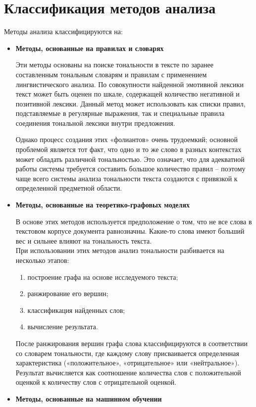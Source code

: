 \documentclass[a4paper,12pt]{report}
\begin{document}
\section{Классификация методов анализа}
\hspace{0.6cm}Методы анализа классифицируются на:
\begin{itemize}

\item \textbf{Методы, основанные на правилах и словарях}

\hspace{0.6cm}Эти методы основаны на поиске тональности в тексте по заранее составленным тональным словарям и правилам с применением лингвистического анализа. По совокупности найденной эмотивной лексики текст может быть оценен по шкале, содержащей количество негативной и позитивной лексики. Данный метод может использовать как списки правил, подставляемые в регулярные выражения, так и специальные правила соединения тональной лексики внутри предложения.

\hspace{0.6cm}Однако процесс создания этих «фолиантов» очень трудоемкий; основной проблемой является тот факт, что одно и то же слово в разных контекстах может обладать различной тональностью. Это означает, что для адекватной работы системы требуется составить большое количество правил – поэтому чаще всего системы анализа тональности текста создаются с привязкой к определенной предметной области.\\

\item \textbf{Методы, основанные на теоретико-графовых моделях}

\hspace{0.6cm}В основе этих методов используется предположение о том, что не все слова в текстовом корпусе документа равнозначны. Какие-то слова имеют больший вес и сильнее влияют на тональность текста.\\ 
При использовании этих методов анализ тональности разбивается на несколько этапов:
\begin{enumerate}
\item построение графа на основе исследуемого текста;
\item ранжирование его вершин;
\item классификация найденных слов;
\item вычисление результата.
\end{enumerate}
\hspace{0.6cm}После ранжирования вершин графа слова классифицируются в соответствии со словарем тональности, где каждому слову присваивается определенная характеристика («положительное», «отрицательное» или «нейтральное»). Результат вычисляется как соотношение количества слов с положительной оценкой к количеству слов с отрицательной оценкой.\\
\item \textbf{Методы, основанные на машинном обучении}


\end{itemize}
\end{document}
